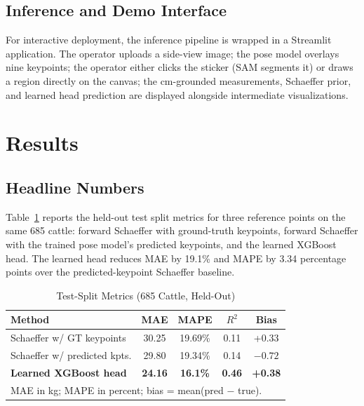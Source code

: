 \documentclass[conference]{IEEEtran}
\begin{document}
\subsection{Inference and Demo Interface}

For interactive deployment, the inference pipeline is wrapped in a Streamlit application. The operator uploads a side-view image; the pose model overlays nine keypoints; the operator either clicks the sticker (SAM segments it) or draws a region directly on the canvas; the cm-grounded measurements, Schaeffer prior, and learned head prediction are displayed alongside intermediate visualizations.

\section{Results}
\label{sec:results}

\subsection{Headline Numbers}

Table~\ref{tab:headline} reports the held-out test split metrics for three reference points on the same 685 cattle: forward Schaeffer with ground-truth keypoints, forward Schaeffer with the trained pose model's predicted keypoints, and the learned XGBoost head. The learned head reduces MAE by 19.1\% and MAPE by 3.34 percentage points over the predicted-keypoint Schaeffer baseline.

\begin{table}[!t]
\caption{Test-Split Metrics (685 Cattle, Held-Out)}
\label{tab:headline}
\centering
\setlength{\tabcolsep}{4pt}
\begin{tabular}{lcccc}
\toprule
\textbf{Method} & \textbf{MAE} & \textbf{MAPE} & \textbf{$R^2$} & \textbf{Bias} \\
\midrule
Schaeffer w/ GT keypoints      & 30.25 & 19.69\% & 0.11 & +0.33 \\
Schaeffer w/ predicted kpts.   & 29.80 & 19.34\% & 0.14 & $-0.72$ \\
\textbf{Learned XGBoost head}  & \textbf{24.16} & \textbf{16.1\%} & \textbf{0.46} & \textbf{+0.38} \\
\bottomrule
\multicolumn{5}{l}{\footnotesize MAE in kg; MAPE in percent; bias = mean(pred $-$ true).}\\
\end{tabular}
\end{table}
\end{document}
